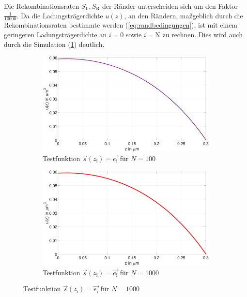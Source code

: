 Die Rekombinationsraten $S_\mathrm{L},S_\mathrm{R}$ der Ränder unterscheiden sich um den Faktor $\frac{1}{10000}$. Da die Ladungsträgerdichte $u(z)$, an den Rändern, maßgeblich durch die Rekombinationsraten bestimmte werden (\cref{eq:randbedingungen}), ist mit einem geringeren Ladungsträgerdichte an $i=0$ sowie $i=\mathrm{N}$ zu rechnen. 
Dies wird auch durch die Simulation (\cref{fig:aufgabe7test}) deutlich. 
\begin{figure}[htb]
	
	\begin{subfigure}[b]{.5\textwidth}
			\includegraphics[width=1\linewidth]{figures/station_gl_2_1/aufgabe_7_test_100}
		\caption{Testfunktion $\vec{s}(z_\mathrm{i})=\vec{e_\mathrm{i}}$ für $N=100$}
		\label{fig:aufgabe7test}
	\end{subfigure}
	\begin{subfigure}[b]{.5\textwidth}
		\centering
			\includegraphics[width=1\linewidth]{figures/station_gl_2_1/aufgabe_7_test_n1000}
		\caption{Testfunktion $\vec{s}(z_\mathrm{i})=\vec{e_\mathrm{i}}$ für $N=1000$}
	\end{subfigure}

\end{figure}
